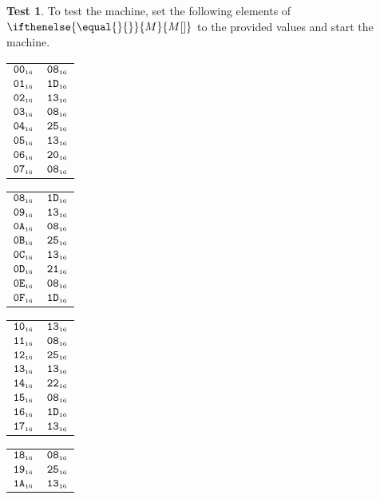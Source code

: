 \documentclass[a4paper,12pt]{article}
\makeatletter
\newcommand{\num}[1]{\texttt{#1}}
\newcommand{\hex}[1]{\num{#1}_{\textup{\tiny 16}}}
\newcommand{\MEM}[1]{\ifthenelse{\equal{#1}{}}{M}{M[#1]}}
\theoremstyle{definition}
\newtheorem{test}{Test}
\newenvironment{memtable}{%
  \begin{trivlist}
    \item
    }{%
    \end{trivlist}}
\newenvironment{memcolumn}{%
  \begin{tabular}{@{}ll@{}}
    \hline}
    {%
    \hline
  \end{tabular}}
\newcommand{\memspace}{\qquad}
\makeatother
\begin{document}
\begin{test}
  To test the machine, set the following elements of $\MEM{}$ to the provided values and start the machine.
  \begin{memtable}
    \begin{memcolumn}
      $\hex{00}$ & $\hex{08}$ \\
      $\hex{01}$ & $\hex{1D}$ \\
      $\hex{02}$ & $\hex{13}$ \\
      $\hex{03}$ & $\hex{08}$ \\
      $\hex{04}$ & $\hex{25}$ \\
      $\hex{05}$ & $\hex{13}$ \\
      $\hex{06}$ & $\hex{20}$ \\
      $\hex{07}$ & $\hex{08}$ \\
    \end{memcolumn}
    \memspace
    \begin{memcolumn}
      $\hex{08}$ & $\hex{1D}$ \\
      $\hex{09}$ & $\hex{13}$ \\
      $\hex{0A}$ & $\hex{08}$ \\
      $\hex{0B}$ & $\hex{25}$ \\
      $\hex{0C}$ & $\hex{13}$ \\
      $\hex{0D}$ & $\hex{21}$ \\
      $\hex{0E}$ & $\hex{08}$ \\
      $\hex{0F}$ & $\hex{1D}$ \\
    \end{memcolumn}
    \memspace
    \begin{memcolumn}
      $\hex{10}$ & $\hex{13}$ \\
      $\hex{11}$ & $\hex{08}$ \\
      $\hex{12}$ & $\hex{25}$ \\
      $\hex{13}$ & $\hex{13}$ \\
      $\hex{14}$ & $\hex{22}$ \\
      $\hex{15}$ & $\hex{08}$ \\
      $\hex{16}$ & $\hex{1D}$ \\
      $\hex{17}$ & $\hex{13}$ \\
    \end{memcolumn}
    \memspace
    \begin{memcolumn}
      $\hex{18}$ & $\hex{08}$ \\
      $\hex{19}$ & $\hex{25}$ \\
      $\hex{1A}$ & $\hex{13}$ \\

\end{memcolumn}
\end{memtable}
\end{test}
\end{document}
